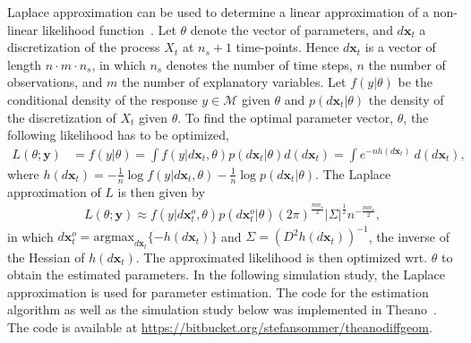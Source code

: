 \documentclass[runningheads,a4paper]{llncs}
\newcommand{\M}{\mathcal{M}}
\begin{document}
Laplace approximation can be used to determine a linear approximation of a non-linear likelihood function~\cite{kass_approximate_1989}. Let $\theta$ denote the vector of parameters, and $d\boldsymbol{x}_t$ a discretization of the process $X_t$ at $n_s+1$ time-points. Hence $d\boldsymbol{x}_t$ is a vector of length $n\cdot m\cdot n_s$, in which $n_s$ denotes the number of time steps, $n$ the number of observations, and $m$ the number of explanatory variables. Let $f(y\lvert\theta)$ be the conditional density of the response $y\in\M$ given $\theta$ and $p(d\boldsymbol{x}_t\lvert\theta)$ the density of the discretization of $X_t$ given $\theta$. To find the optimal parameter vector, $\theta$, the following likelihood has to be optimized,
\begin{align}
L(\theta;\boldsymbol{y}) &= f(y\lvert\theta) = \int f(y\lvert d\boldsymbol{x}_t,\theta)p(d\boldsymbol{x}_t\lvert\theta) d(d\boldsymbol{x}_t) = \int e^{-n h(d\boldsymbol{x}_t)} \ d(d\boldsymbol{x}_t),
\end{align}
where $h(d\boldsymbol{x}_t) = -\frac{1}{n} \log f(y\lvert d\boldsymbol{x}_t,\theta) - \frac{1}{n}\log p(d\boldsymbol{x}_t\lvert\theta)$.
The Laplace approximation of $L$ is then given by
\begin{align}
L(\theta;\boldsymbol{y}) \approx f(y\lvert d\boldsymbol{x}^{o}_t,\theta)p(d\boldsymbol{x}^{o}_t\lvert\theta)(2\pi)^{\frac{mn_s}{2}}\lvert\Sigma\lvert^{\frac{1}{2}} n^{-\frac{mn_s}{2}},
\label{eq:apL}
\end{align}
in which $d\boldsymbol{x}^{o}_t = \text{argmax}_{d\boldsymbol{x}_t}\{-h(d\boldsymbol{x}_t)\}$ and $\Sigma = \left(D^2 h(d\boldsymbol{x}_t)\right)^{-1}$, the inverse of the Hessian of $h(d\boldsymbol{x}_t)$. The approximated likelihood is then optimized wrt. $\theta$ to obtain the estimated parameters. In the following simulation study, the Laplace approximation is used for parameter estimation. The code for the estimation algorithm as well as the simulation study below was implemented in Theano~\cite{2016arXiv160502688short}. The code is available at \url{https://bitbucket.org/stefansommer/theanodiffgeom}.
\end{document}
